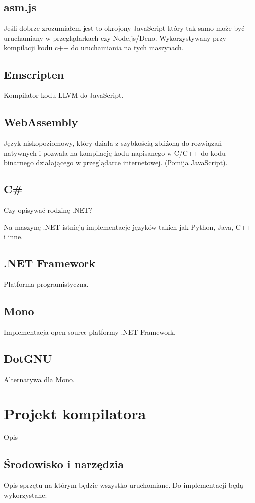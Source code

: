 \documentclass[a4paper]{article}
\begin{document}
\subsection{asm.js}
Jeśli dobrze zrozumiałem jest to okrojony JavaScript który tak samo może być uruchamiany w przeglądarkach czy Node.js/Deno.
Wykorzystywany przy kompilacji kodu c++ do uruchamiania na tych maszynach.

\subsection{Emscripten}
Kompilator kodu LLVM do JavaScript.

\subsection{WebAssembly}
Język niskopoziomowy, który działa z szybkością zbliżoną do rozwiązań natywnych i pozwala na kompilację kodu napisanego w C/C++ do kodu binarnego działającego w przeglądarce internetowej.
(Pomija JavaScript).

\subsection{C\#}
Czy opisywać rodzinę .NET?

Na maszynę .NET istnieją implementacje języków takich jak Python, Java, C++ i inne.

\subsection{.NET Framework}
Platforma programistyczna.

\subsection{Mono}
Implementacja open source platformy .NET Framework.

\subsection{DotGNU}
Alternatywa dla Mono.



\section{Projekt kompilatora}
Opis 
\subsection{Środowisko i narzędzia}
Opis sprzętu na którym będzie wszystko uruchomiane.
Do implementacji będą wykorzystane:
\end{document}
